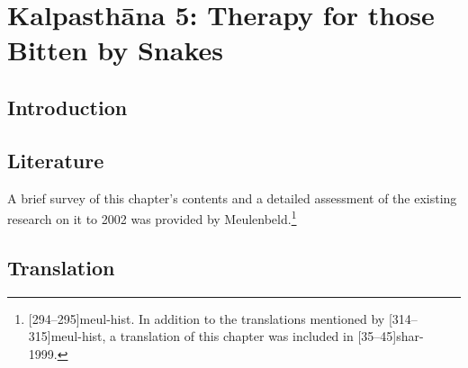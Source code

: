 \chapter{Kalpasthāna 5: Therapy for those Bitten by Snakes}

\section{Introduction} 

\section{Literature}

A brief survey of this chapter's contents and a detailed assessment of
the existing research on it to 2002 was provided by
Meulenbeld.\footnote{[294--295]{meul-hist}. In addition to the
    translations mentioned by [314--315]{meul-hist}, a translation
    of this chapter was included in [35--45]{shar-1999}.} 
    
    
    \newpage
    
\section{Translation}

